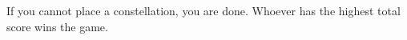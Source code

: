 \begin{minipage}{6cm}
If you cannot place a constellation, you are done.
Whoever has the highest total score wins the game.


%
%

\end{minipage}
